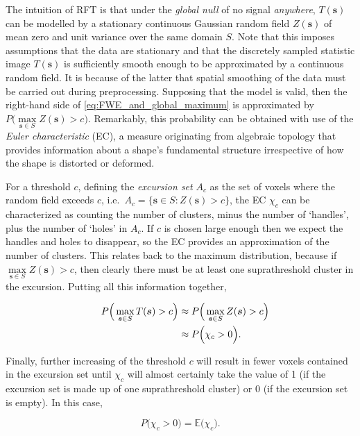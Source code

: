 The intuition of RFT is that under the \textit{global null} of no signal \textit{anywhere}, $T(\bm{s})$ can be modelled by a stationary continuous Gaussian random field $Z(\bm{s})$ of mean zero and unit variance over the same domain $S$. Note that this imposes assumptions that the data are stationary and that the discretely sampled statistic image $T(\bm{s})$ is sufficiently smooth enough to be approximated by a continuous random field. It is because of the latter that spatial smoothing of the data must be carried out during preprocessing.  Supposing that the model is valid, then the right-hand side of \ref{eq:FWE_and_global_maximum} is approximated by $P\Big(\max\limits_{\bm{s} \in S} Z(\bm{s}) > c \Big)$. Remarkably, this probability can be obtained with use of the \textit{Euler characteristic} (EC), a measure originating from algebraic topology that provides information about a shape's fundamental structure irrespective of how the shape is distorted or deformed. 

For a threshold $c$, defining the \textit{excursion set} $A_{c}$ as the set of voxels where the random field exceeds $c$, i.e.\ $A_{c} = \Big\{ \bm{s} \in S : Z(\bm{s}) > c \Big\}$, the EC $\chi_{c}$ can be characterized as counting the number of clusters, minus the number of `handles', plus the number of `holes' in $A_c$. If $c$ is chosen large enough then we expect the handles and holes to disappear, so the EC provides an approximation of the number of clusters. This relates back to the maximum distribution, because if $\max\limits_{\bm{s} \in S} Z(\bm{s}) > c$, then clearly there must be at least one suprathreshold cluster in the excursion. Putting all this information together,

\begin{alignat}{4}
\label{eq:prob_EC}
&&P\Big(\max\limits_{\bm{s} \in S} T(\bm{s}) > c \Big)
&\approx P\Big(\max\limits_{\bm{s} \in S} Z(\bm{s}) > c \Big) \notag\\
&
&
&\approx P\Big(\chi_{c} > 0\Big).
\end{alignat}

Finally, further increasing of the threshold $c$ will result in fewer voxels contained in the excursion set until $\chi_{c}$ will almost certainly take the value of 1 (if the excursion set is made up of one suprathreshold cluster) or 0 (if the excursion set is empty). In this case,

\begin{equation}
\label{eq:EC_high_threshold}
P\Big(\chi_{c} > 0\Big) = \mathbb{E}\Big(\chi_{c} \Big).
\end{equation}

